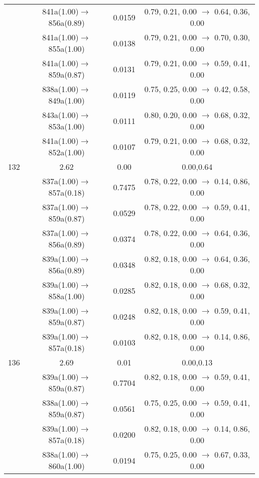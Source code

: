 \documentclass[10pt,a4paper]{article}
\begin{document}
\begin{longtable}{c|c|c|c}
 	& 841a(1.00)$\rightarrow$856a(0.89) &	 0.0159 &	 0.79, 0.21, 0.00 $\rightarrow$ 0.64, 0.36, 0.00 \\ 
 	& 841a(1.00)$\rightarrow$855a(1.00) &	 0.0138 &	 0.79, 0.21, 0.00 $\rightarrow$ 0.70, 0.30, 0.00 \\ 
 	& 841a(1.00)$\rightarrow$859a(0.87) &	 0.0131 &	 0.79, 0.21, 0.00 $\rightarrow$ 0.59, 0.41, 0.00 \\ 
 	& 838a(1.00)$\rightarrow$849a(1.00) &	 0.0119 &	 0.75, 0.25, 0.00 $\rightarrow$ 0.42, 0.58, 0.00 \\ 
 	& 843a(1.00)$\rightarrow$853a(1.00) &	 0.0111 &	 0.80, 0.20, 0.00 $\rightarrow$ 0.68, 0.32, 0.00 \\ 
 	& 841a(1.00)$\rightarrow$852a(1.00) &	 0.0107 &	 0.79, 0.21, 0.00 $\rightarrow$ 0.68, 0.32, 0.00 \\ 
 \hline132 &	 2.62 &	 0.00 &	 0.00,0.64 \\ 
  	& 837a(1.00)$\rightarrow$857a(0.18) &	 0.7475 &	 0.78, 0.22, 0.00 $\rightarrow$ 0.14, 0.86, 0.00 \\ 
 	& 837a(1.00)$\rightarrow$859a(0.87) &	 0.0529 &	 0.78, 0.22, 0.00 $\rightarrow$ 0.59, 0.41, 0.00 \\ 
 	& 837a(1.00)$\rightarrow$856a(0.89) &	 0.0374 &	 0.78, 0.22, 0.00 $\rightarrow$ 0.64, 0.36, 0.00 \\ 
 	& 839a(1.00)$\rightarrow$856a(0.89) &	 0.0348 &	 0.82, 0.18, 0.00 $\rightarrow$ 0.64, 0.36, 0.00 \\ 
 	& 839a(1.00)$\rightarrow$858a(1.00) &	 0.0285 &	 0.82, 0.18, 0.00 $\rightarrow$ 0.68, 0.32, 0.00 \\ 
 	& 839a(1.00)$\rightarrow$859a(0.87) &	 0.0248 &	 0.82, 0.18, 0.00 $\rightarrow$ 0.59, 0.41, 0.00 \\ 
 	& 839a(1.00)$\rightarrow$857a(0.18) &	 0.0103 &	 0.82, 0.18, 0.00 $\rightarrow$ 0.14, 0.86, 0.00 \\ 
 \hline136 &	 2.69 &	 0.01 &	 0.00,0.13 \\ 
  	& 839a(1.00)$\rightarrow$859a(0.87) &	 0.7704 &	 0.82, 0.18, 0.00 $\rightarrow$ 0.59, 0.41, 0.00 \\ 
 	& 838a(1.00)$\rightarrow$859a(0.87) &	 0.0561 &	 0.75, 0.25, 0.00 $\rightarrow$ 0.59, 0.41, 0.00 \\ 
 	& 839a(1.00)$\rightarrow$857a(0.18) &	 0.0200 &	 0.82, 0.18, 0.00 $\rightarrow$ 0.14, 0.86, 0.00 \\ 
 	& 838a(1.00)$\rightarrow$860a(1.00) &	 0.0194 &	 0.75, 0.25, 0.00 $\rightarrow$ 0.67, 0.33, 0.00 \\ 

\end{longtable}
\end{document}
